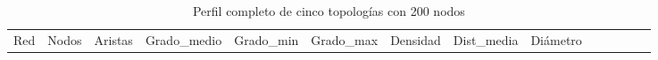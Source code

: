 \documentclass[
  letterpaper,
  DIV=11,
  numbers=noendperiod]{scrreprt}
\begin{document}
\begin{tcolorbox}
\begin{longtable}[]{@{}
  >{\raggedright\arraybackslash}p{}
  >{\raggedleft\arraybackslash}p{}
  >{\raggedleft\arraybackslash}p{}
  >{\raggedleft\arraybackslash}p{}
  >{\raggedleft\arraybackslash}p{}
  >{\raggedleft\arraybackslash}p{}
  >{\raggedleft\arraybackslash}p{}
  >{\raggedleft\arraybackslash}p{}
  >{\raggedleft\arraybackslash}p{}
  >{\raggedleft\arraybackslash}p{}
  >{\raggedleft\arraybackslash}p{}
  >{\raggedleft\arraybackslash}p{}
  >{\raggedleft\arraybackslash}p{}
  >{\raggedleft\arraybackslash}p{}@{}}
\caption{Perfil completo de cinco topologías con 200
nodos}\tabularnewline
\toprule\noalign{}
\begin{minipage}[b]{\linewidth}\raggedright
Red
\end{minipage} & \begin{minipage}[b]{\linewidth}\raggedleft
Nodos
\end{minipage} & \begin{minipage}[b]{\linewidth}\raggedleft
Aristas
\end{minipage} & \begin{minipage}[b]{\linewidth}\raggedleft
Grado\_medio
\end{minipage} & \begin{minipage}[b]{\linewidth}\raggedleft
Grado\_min
\end{minipage} & \begin{minipage}[b]{\linewidth}\raggedleft
Grado\_max
\end{minipage} & \begin{minipage}[b]{\linewidth}\raggedleft
Densidad
\end{minipage} & \begin{minipage}[b]{\linewidth}\raggedleft
Dist\_media
\end{minipage} & \begin{minipage}[b]{\linewidth}\raggedleft
Diámetro
\end{minipage} & \begin{minipage}[b]{\linewidth}\raggedleft

\end{minipage}
\end{longtable}
\end{tcolorbox}
\end{document}

